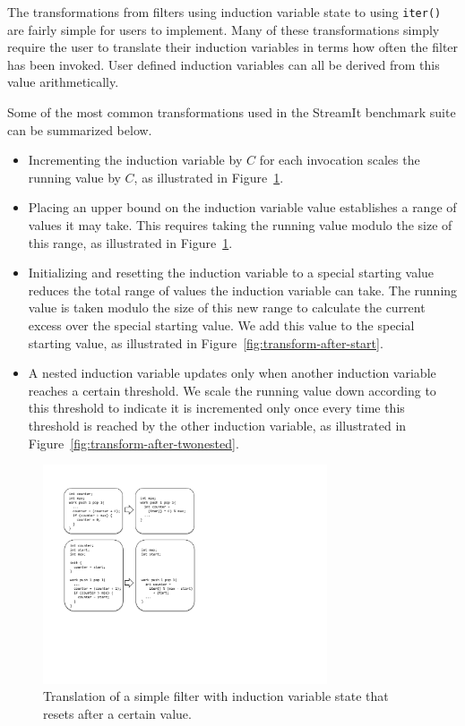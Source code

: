 The transformations from filters using induction variable state to using {\tt iter()} are fairly simple for users to implement.  Many of these transformations simply require the user to translate their induction variables in terms how often the filter has been invoked.  User defined induction variables can all be derived from this value arithmetically.  

Some of the most common transformations used in the StreamIt benchmark suite can be summarized below.  
\begin{itemize}
\item Incrementing the induction variable by $C$ for each invocation scales the running value by $C$, as illustrated in Figure~\ref{fig:transform-after-simple}.

\item Placing an upper bound on the induction variable value establishes a range of values it may take.  This requires taking the running value modulo the size of this range, as illustrated in Figure~\ref{fig:transform-after-simple}.

\item Initializing and resetting the induction variable to a special starting value reduces the total range of values the induction variable can take.  The running value is taken modulo the size of this new range to calculate the current excess over the special starting value.  We add this value to the special starting value, as illustrated in Figure~\ref{fig:transform-after-start}.

\item A nested induction variable updates only when another induction variable reaches a certain threshold.  We scale the running value down according to this threshold to indicate it is incremented only once every time this threshold is reached by the other induction variable, as illustrated in Figure~\ref{fig:transform-after-twonested}.
\end{itemize}

\begin{figure}[t]
\includegraphics[width=3.3in]{figures/transformation1.pdf}
\caption{Translation of a simple filter with induction variable state that resets after a certain value. \protect\label{fig:transform-after-simple}}
\end{figure}

